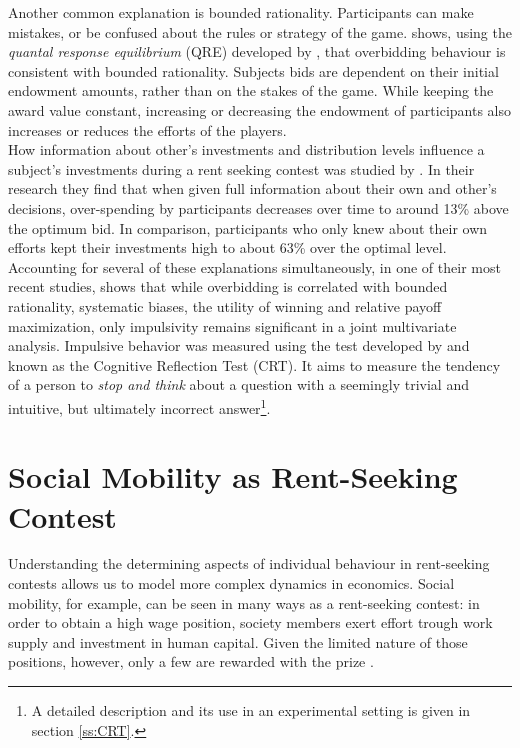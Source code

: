 Another common explanation is bounded rationality. Participants can make mistakes, or be confused about the rules or strategy of the game. \cite{sheremeta2011} shows, using the \textit{quantal response equilibrium} (QRE) developed by \cite{mckelvey1995}, that overbidding behaviour is consistent with bounded rationality. Subjects bids are dependent on their initial endowment amounts, rather than on the stakes of the game. While keeping the award value constant, increasing or decreasing the endowment of participants also increases or reduces the efforts of the players.\\ 

How information about other's investments and distribution levels influence a subject's investments during a rent seeking contest was studied by \cite{fallucchi2013}. In their research they find that when given full information about their own and other's decisions, over-spending by participants decreases over time to around 13\% above the optimum bid. In comparison, participants who only knew about their own efforts kept their investments high to about 63\% over the optimal level.\\

Accounting for several of these explanations simultaneously, in one of their most recent studies, \cite{sheremeta2016} shows that while overbidding is correlated with bounded rationality, systematic biases, the utility of winning and relative payoff maximization, only impulsivity remains significant in a joint multivariate analysis. Impulsive behavior was measured using the test developed by \cite{frederick2005} and known as the Cognitive Reflection Test (CRT). It aims to measure the tendency of a person to \textit{stop and think} about a question with a seemingly trivial and intuitive, but ultimately incorrect answer\footnote{A detailed description and its use in an experimental setting is given in section \ref{ss:CRT}.}.\\

\section{Social Mobility as Rent-Seeking Contest}
\label{sec:soc_mob}

Understanding the determining aspects of individual behaviour in rent-seeking contests allows us to model more complex dynamics in economics. Social mobility, for example, can be seen in many ways as a rent-seeking contest: in order to obtain a high wage position, society members exert effort trough work supply and investment in human capital. Given the limited nature of those positions, however, only a few are rewarded with the prize \citep{burkhauser2011}.\\

